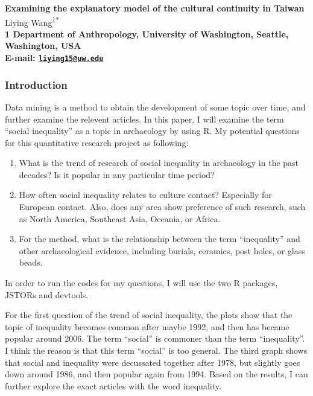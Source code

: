\documentclass[10pt]{article}
\date{}
\begin{document}
\begin{flushleft}
{\Large
\textbf{Examining the explanatory model of the cultural continuity in Taiwan}
}
\\
  Liying Wang\textsuperscript{1*}\\
\bf{1} Department of Anthropology, University of Washington,  Seattle,  Washington,  USA
\\

\textasteriskcentered{} E-mail:   \href{mailto:liying15@uw.edu}{\nolinkurl{liying15@uw.edu}}

\end{flushleft}

\subsubsection{Introduction}\label{introduction}

Data mining is a method to obtain the development of some topic over
time, and further examine the relevent articles. In this paper, I will
examine the term ``social inequality'' as a topic in archaeology by
using R. My potential questions for this quantitative research project
as following:

\begin{enumerate}
\def\labelenumi{\arabic{enumi}.}
\item
  What is the trend of research of social inequality in archaeology in
  the past decades? Is it popular in any particular time period?
\item
  How often social inequality relates to culture contact? Especially for
  European contact. Also, does any area show preference of such
  research, such as North America, Southeast Asia, Oceania, or Africa.
\item
  For the method, what is the relationship between the term
  ``inequality'' and other archaeological evidence, including burials,
  ceramics, post holes, or glass beads.
\end{enumerate}

In order to run the codes for my questions, I will use the two R
packages, JSTORs and devtools.

For the first question of the trend of social inequality, the plots show
that the topic of inequality becomes common after maybe 1992, and then
has became popular around 2006. The term ``social'' is commoner than the
term ``inequality''. I think the reason is that this term ``social'' is
too general. The third graph shows that social and inequality were
decussated together after 1978, but slightly goes down around 1986, and
then popular again from 1994. Based on the results, I can further
explore the exact articles with the word inequality.
\end{document}
